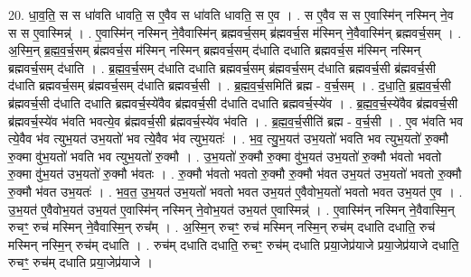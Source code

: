 \documentclass[17pt]{extarticle}
\begin{document}
20. धा॒व॒ति॒ स स धा॑वति धावति॒ स ए॒वैव स धा॑वति धावति॒ स ए॒व । . स ए॒वैव स स ए॒वास्मि॑न् नस्मिन् ने॒व स स ए॒वास्मिन्न्॑ । . ए॒वास्मि॑न् नस्मिन् ने॒वैवास्मि॑न् ब्रह्मवर्च॒सम् ब्र॑ह्मवर्च॒स म॑स्मिन् ने॒वैवास्मि॑न् ब्रह्मवर्च॒सम् । . अ॒स्मि॒न् ब्र॒ह्म॒व॒र्च॒सम् ब्र॑ह्मवर्च॒स म॑स्मिन् नस्मिन् ब्रह्मवर्च॒सम् द॑धाति दधाति ब्रह्मवर्च॒स म॑स्मिन् नस्मिन् ब्रह्मवर्च॒सम् द॑धाति । . ब्र॒ह्म॒व॒र्च॒सम् द॑धाति दधाति ब्रह्मवर्च॒सम् ब्र॑ह्मवर्च॒सम् द॑धाति ब्रह्मवर्च॒सी ब्र॑ह्मवर्च॒सी द॑धाति ब्रह्मवर्च॒सम् ब्र॑ह्मवर्च॒सम् द॑धाति ब्रह्मवर्च॒सी । . ब्र॒ह्म॒व॒र्च॒समिति॑ ब्रह्म - व॒र्च॒सम् । . द॒धा॒ति॒ ब्र॒ह्म॒व॒र्च॒सी ब्र॑ह्मवर्च॒सी द॑धाति दधाति ब्रह्मवर्च॒स्ये॑वैव ब्र॑ह्मवर्च॒सी द॑धाति दधाति ब्रह्मवर्च॒स्ये॑व । . ब्र॒ह्म॒व॒र्च॒स्ये॑वैव ब्र॑ह्मवर्च॒सी ब्र॑ह्मवर्च॒स्ये॑व भ॑वति भवत्ये॒व ब्र॑ह्मवर्च॒सी ब्र॑ह्मवर्च॒स्ये॑व भ॑वति । . ब्र॒ह्म॒व॒र्च॒सीति॑ ब्रह्म - व॒र्च॒सी । . ए॒व भ॑वति भव त्ये॒वैव भ॑व त्युभ॒यत॑ उभ॒यतो॑ भव त्ये॒वैव भ॑व त्युभ॒यतः॑ । . भ॒व॒ त्यु॒भ॒यत॑ उभ॒यतो॑ भवति भव त्युभ॒यतो॑ रु॒क्मौ रु॒क्मा वु॑भ॒यतो॑ भवति भव त्युभ॒यतो॑ रु॒क्मौ । . उ॒भ॒यतो॑ रु॒क्मौ रु॒क्मा वु॑भ॒यत॑ उभ॒यतो॑ रु॒क्मौ भ॑वतो भवतो रु॒क्मा वु॑भ॒यत॑ उभ॒यतो॑ रु॒क्मौ भ॑वतः । . रु॒क्मौ भ॑वतो भवतो रु॒क्मौ रु॒क्मौ भ॑वत उभ॒यत॑ उभ॒यतो॑ भवतो रु॒क्मौ रु॒क्मौ भ॑वत उभ॒यतः॑ । . भ॒व॒त॒ उ॒भ॒यत॑ उभ॒यतो॑ भवतो भवत उभ॒यत॑ ए॒वैवोभ॒यतो॑ भवतो भवत उभ॒यत॑ ए॒व । . उ॒भ॒यत॑ ए॒वैवोभ॒यत॑ उभ॒यत॑ ए॒वास्मि॑न् नस्मिन् ने॒वोभ॒यत॑ उभ॒यत॑ ए॒वास्मिन्न्॑ । . ए॒वास्मि॑न् नस्मिन् ने॒वैवास्मि॒न् रुचꣳ॒॒ रुच॑ मस्मिन् ने॒वैवास्मि॒न् रुच᳚म् । . अ॒स्मि॒न् रुचꣳ॒॒ रुच॑ मस्मिन् नस्मि॒न् रुच॑म् दधाति दधाति॒ रुच॑ मस्मिन् नस्मि॒न् रुच॑म् दधाति । . रुच॑म् दधाति दधाति॒ रुचꣳ॒॒ रुच॑म् दधाति प्रया॒जेप्र॑याजे प्रया॒जेप्र॑याजे दधाति॒ रुचꣳ॒॒ रुच॑म् दधाति प्रया॒जेप्र॑याजे । \newline
\end{document}
